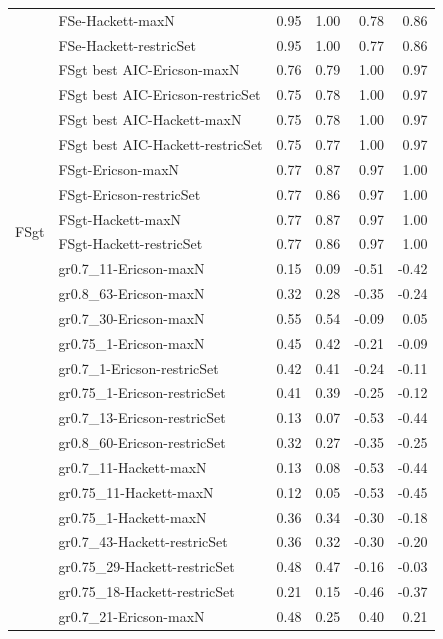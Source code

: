 {\begin{landscape}
\begin{footnotesize}
\begin{longtable}{@{}ll|rrrr@{}}
 & FSe-Hackett-maxN & 0.95 & 1.00 & 0.78 & 0.86 \\
 & FSe-Hackett-restricSet & 0.95 & 1.00 & 0.77 & 0.86 \\
\addlinespace
\multirow{6}{*}{FSgt} & FSgt best AIC-Ericson-maxN & 0.76 & 0.79 & 1.00 & 0.97 \\
 & FSgt best AIC-Ericson-restricSet & 0.75 & 0.78 & 1.00 & 0.97 \\
 & FSgt best AIC-Hackett-maxN & 0.75 & 0.78 & 1.00 & 0.97 \\
 & FSgt best AIC-Hackett-restricSet & 0.75 & 0.77 & 1.00 & 0.97 \\
 & FSgt-Ericson-maxN & 0.77 & 0.87 & 0.97 & 1.00 \\
 & FSgt-Ericson-restricSet & 0.77 & 0.86 & 0.97 & 1.00 \\
\multirow{2}{*}{FSgt} & FSgt-Hackett-maxN & 0.77 & 0.87 & 0.97 & 1.00 \\
 & FSgt-Hackett-restricSet & 0.77 & 0.86 & 0.97 & 1.00 \\
\addlinespace
\multirow{14}{*}{Iteroparity} & gr0.7\_11-Ericson-maxN & 0.15 & 0.09 & -0.51 & -0.42 \\
 & gr0.8\_63-Ericson-maxN & 0.32 & 0.28 & -0.35 & -0.24 \\
 & gr0.7\_30-Ericson-maxN & 0.55 & 0.54 & -0.09 & 0.05 \\
 & gr0.75\_1-Ericson-maxN & 0.45 & 0.42 & -0.21 & -0.09 \\
 & gr0.7\_1-Ericson-restricSet & 0.42 & 0.41 & -0.24 & -0.11 \\
 & gr0.75\_1-Ericson-restricSet & 0.41 & 0.39 & -0.25 & -0.12 \\
 & gr0.7\_13-Ericson-restricSet & 0.13 & 0.07 & -0.53 & -0.44 \\
 & gr0.8\_60-Ericson-restricSet & 0.32 & 0.27 & -0.35 & -0.25 \\
 & gr0.7\_11-Hackett-maxN & 0.13 & 0.08 & -0.53 & -0.44 \\
 & gr0.75\_11-Hackett-maxN & 0.12 & 0.05 & -0.53 & -0.45 \\
 & gr0.75\_1-Hackett-maxN & 0.36 & 0.34 & -0.30 & -0.18 \\
 & gr0.7\_43-Hackett-restricSet & 0.36 & 0.32 & -0.30 & -0.20 \\
 & gr0.75\_29-Hackett-restricSet & 0.48 & 0.47 & -0.16 & -0.03 \\
 & gr0.75\_18-Hackett-restricSet & 0.21 & 0.15 & -0.46 & -0.37 \\
\addlinespace
\multirow{11}{*}{Offspring Q-Q} & gr0.7\_21-Ericson-maxN & 0.48 & 0.25 & 0.40 & 0.21 \\

\end{longtable}
\end{footnotesize}
\end{landscape}}
